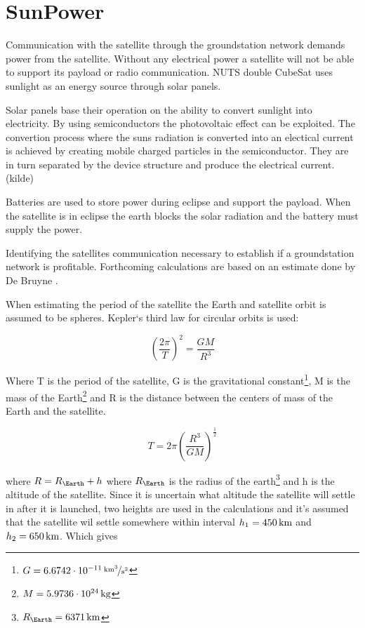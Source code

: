 \section{SunPower}

Communication with the satellite through the groundstation network demands power from the satellite. Without any electrical power a satellite will not be able to support its payload or radio communication. NUTS double CubeSat uses sunlight as an energy source through solar panels. 

Solar panels base their operation on the ability to convert sunlight into electricity. By using semiconductors the photovoltaic effect can be exploited. The convertion process where the suns radiation is converted into an electical current is achieved by creating mobile charged particles in the semiconductor. They are in turn separated by the device structure and produce the electrical current.(kilde) 

Batteries are used to store power during eclipse and support the payload. When the satellite is in eclipse the earth blocks the solar radiation and the battery must supply the power.

Identifying the satellites communication necessary to establish if a groundstation network is profitable. Forthcoming calculations are based on an estimate done by De Bruyne \cite{Satellite Power Systems}.

When estimating the period of the satellite the Earth and satellite orbit is assumed to be spheres. Kepler`s third law for circular orbits is used:

\begin{equation}
\left(\frac{2\pi}{T}\right)^2 = \frac{GM}{R^3}
\label{eq:Keplers_3}
\end{equation}

Where T is the period of the satellite, G is the gravitational constant\footnote{$G=\unitfrac[6.6742\cdot 10^{-11}]{km^3}{s^2}$}, M is the mass of the Earth\footnote{$M=\unit[5.9736\cdot 10^{24}]{kg}$} and R is the distance between the centers of mass of the Earth and the satellite.

\begin{equation}
T = 2\pi \left(\frac{R^3}{GM}\right)^{\frac{1}{2}}
\label{eq:satellite_period}
\end{equation}

where $R = R_\Earth + h$ where $R_\Earth$ is the radius of the earth\footnote{$R_\Earth = \unit[6371]{km}$} and h is the altitude of the satellite. 
Since it is uncertain what altitude the satellite will settle in after it is launched, two heights are used in the calculations and it's assumed that the satellite wil settle somewhere within interval $h_1=\unit[450]{km}$ and $h_2=\unit[650]{km}$. 
Which gives

